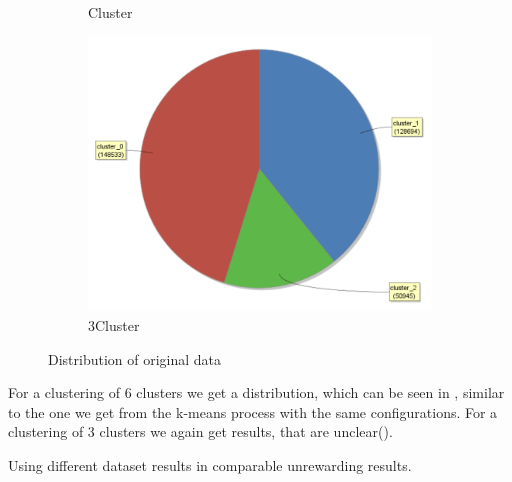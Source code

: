 \begin{figure}[H]
\begin{subfigure}{.3\textwidth}
  \caption{Cluster}
  \label{fig:PCAOrgCl}
\end{subfigure}
\begin{subfigure}{.3\textwidth}
  \centering
  \includegraphics[width=.9\linewidth]{ClusterPCAOrigRapidCluster2Cluster.PNG}
  \caption{3Cluster}
  \label{fig:PCAOrgCl3}
\end{subfigure}
\caption{Distribution of original data}
\label{fig:PCAOrgDist}
\vspace*{-2em}
\end{figure}

For a clustering of 6 clusters we get a distribution, which can be seen in , similar to the one we get from the k-means process with the same configurations. 
For a clustering of 3 clusters we again get results, that are unclear().


Using different dataset results in comparable unrewarding results.
\vspace*{-2em}